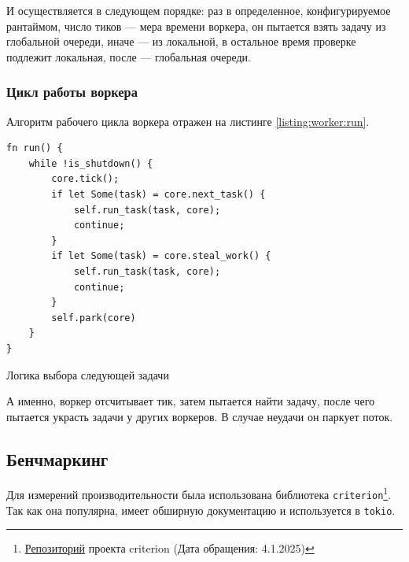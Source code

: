 И осуществляется в следующем порядке: раз в определенное, конфигурируемое рантаймом, число тиков --- мера времени воркера, он пытается взять задачу из глобальной очереди, иначе --- из локальной, в остальное время проверке подлежит локальная, после --- глобальная очереди.

\subsubsection{Цикл работы воркера}

Алгоритм рабочего цикла воркера отражен на листинге \ref{listing:worker:run}.

\begin{listing}[H]
    \begin{verbatim}
fn run() {
    while !is_shutdown() {
        core.tick();
        if let Some(task) = core.next_task() {
            self.run_task(task, core);
            continue;
        }
        if let Some(task) = core.steal_work() {
            self.run_task(task, core);
            continue;
        }
        self.park(core)
    }
}
    \end{verbatim}

    \caption{Логика выбора следующей задачи}
    \label{listing:worker:run}
\end{listing}

А именно, воркер отсчитывает тик, затем пытается найти задачу, после чего пытается украсть задачи у других воркеров. В случае неудачи он паркует поток.

\subsection{Бенчмаркинг}

Для измерений производительности была использована библиотека \verb|criterion|\footnote{\href{https://github.com/bheisler/criterion.rs}{Репозиторий} проекта criterion (Дата обращения: 4.1.2025)}. Так как она популярна, имеет обширную документацию и используется в \verb|tokio|.
